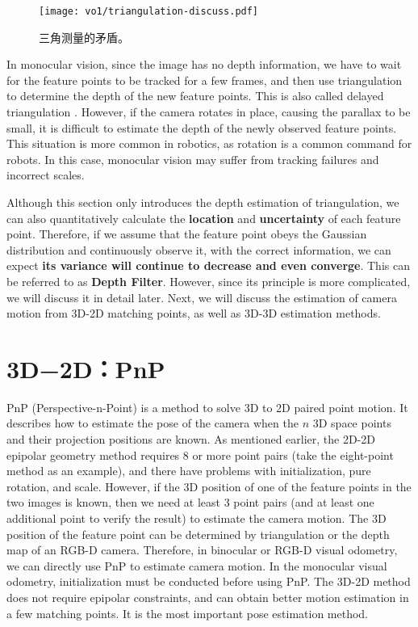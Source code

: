 \begin{figure}[!ht]
	\centering
	\texttt{[image: vo1/triangulation-discuss.pdf]}
	\caption{三角测量的矛盾。}
	\label{fig:triangulation-discuss}
\end{figure}

In monocular vision, since the image has no depth information, we have to wait for the feature points to be tracked for a few frames, and then use triangulation to determine the depth of the new feature points. This is also called delayed triangulation \textsuperscript{\cite{Davison2003}}. However, if the camera rotates in place, causing the parallax to be small, it is difficult to estimate the depth of the newly observed feature points. This situation is more common in robotics, as rotation is a common command for robots. In this case, monocular vision may suffer from tracking failures and incorrect scales.

Although this section only introduces the depth estimation of triangulation, we can also quantitatively calculate the \textbf{location} and \textbf{uncertainty} of each feature point. Therefore, if we assume that the feature point obeys the Gaussian distribution and continuously observe it, with the correct information, we can expect \textbf{its variance will continue to decrease and even converge}. This can be referred to as \textbf{Depth Filter}. However, since its principle is more complicated, we will discuss it in detail later. Next, we will discuss the estimation of camera motion from 3D-2D matching points, as well as 3D-3D estimation methods.

\section{3D−2D：PnP}
PnP (Perspective-n-Point) is a method to solve 3D to 2D paired point motion. It describes how to estimate the pose of the camera when the $n$ 3D space points and their projection positions are known. As mentioned earlier, the 2D-2D epipolar geometry method requires 8 or more point pairs (take the eight-point method as an example), and there have problems with initialization, pure rotation, and scale. However, if the 3D position of one of the feature points in the two images is known, then we need at least 3 point pairs (and at least one additional point to verify the result) to estimate the camera motion. The 3D position of the feature point can be determined by triangulation or the depth map of an RGB-D camera. Therefore, in binocular or RGB-D visual odometry, we can directly use PnP to estimate camera motion. In the monocular visual odometry, initialization must be conducted before using PnP. The 3D-2D method does not require epipolar constraints, and can obtain better motion estimation in a few matching points. It is the most important pose estimation method.

